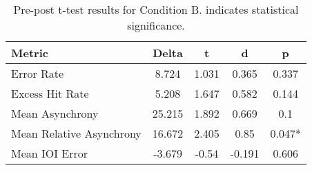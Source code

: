 
    \begin{table}[H]
    \centering
    \begin{small}
    \begin{tabular}{lcccc}
\toprule
Metric & Delta & t & d & p \\
\midrule
Error Rate & 8.724 & 1.031 & 0.365 & 0.337 \\
Excess Hit Rate & 5.208 & 1.647 & 0.582 & 0.144 \\
Mean Asynchrony & 25.215 & 1.892 & 0.669 & 0.1 \\
Mean Relative Asynchrony & 16.672 & 2.405 & 0.85 & 0.047* \\
Mean IOI Error & -3.679 & -0.54 & -0.191 & 0.606 \\
\bottomrule
\end{tabular}

    \end{small}
    \caption[Pre-post t-test results for Condition B]{Pre-post t-test results for Condition B. \newline * indicates statistical significance.}
    \label{tab:PrePost_B}
    \end{table}